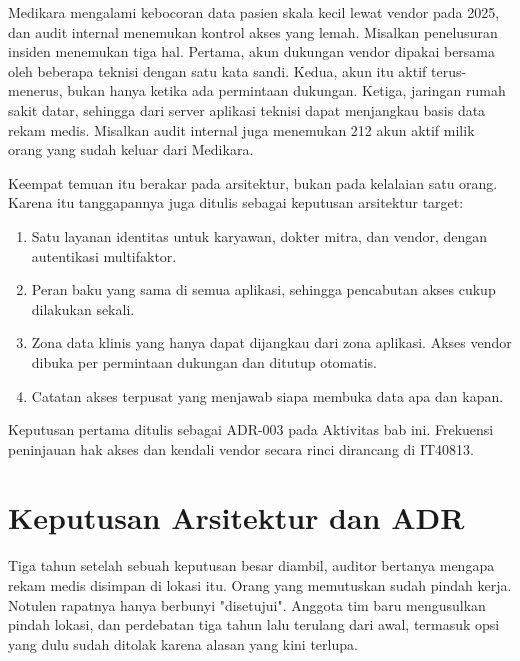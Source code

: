 \begin{kasus}[title={Kasus Medikara Health: Audit Kontrol Akses dan Insiden lewat Vendor}]
Medikara mengalami kebocoran data pasien skala kecil lewat vendor pada 2025,
dan audit internal menemukan kontrol akses yang lemah. Misalkan penelusuran
insiden menemukan tiga hal. Pertama, akun dukungan vendor dipakai bersama oleh
beberapa teknisi dengan satu kata sandi. Kedua, akun itu aktif terus-menerus,
bukan hanya ketika ada permintaan dukungan. Ketiga, jaringan rumah sakit
datar, sehingga dari server aplikasi teknisi dapat menjangkau basis data
rekam medis. Misalkan audit internal juga menemukan 212 akun aktif milik
orang yang sudah keluar dari Medikara.

Keempat temuan itu berakar pada arsitektur, bukan pada kelalaian satu orang.
Karena itu tanggapannya juga ditulis sebagai keputusan arsitektur target:

\begin{enumerate}
  \item Satu layanan identitas untuk karyawan, dokter mitra, dan vendor,
        dengan autentikasi multifaktor.
  \item Peran baku yang sama di semua aplikasi, sehingga pencabutan akses
        cukup dilakukan sekali.
  \item Zona data klinis yang hanya dapat dijangkau dari zona aplikasi. Akses
        vendor dibuka per permintaan dukungan dan ditutup otomatis.
  \item Catatan akses terpusat yang menjawab siapa membuka data apa dan
        kapan.
\end{enumerate}

Keputusan pertama ditulis sebagai ADR-003 pada Aktivitas bab ini. Frekuensi
peninjauan hak akses dan kendali vendor secara rinci dirancang di IT40813.
\end{kasus}

\section{Keputusan Arsitektur dan ADR}

Tiga tahun setelah sebuah keputusan besar diambil, auditor bertanya mengapa
rekam medis disimpan di lokasi itu. Orang yang memutuskan sudah pindah kerja.
Notulen rapatnya hanya berbunyi "disetujui". Anggota tim baru mengusulkan
pindah lokasi, dan perdebatan tiga tahun lalu terulang dari awal, termasuk
opsi yang dulu sudah ditolak karena alasan yang kini terlupa.

